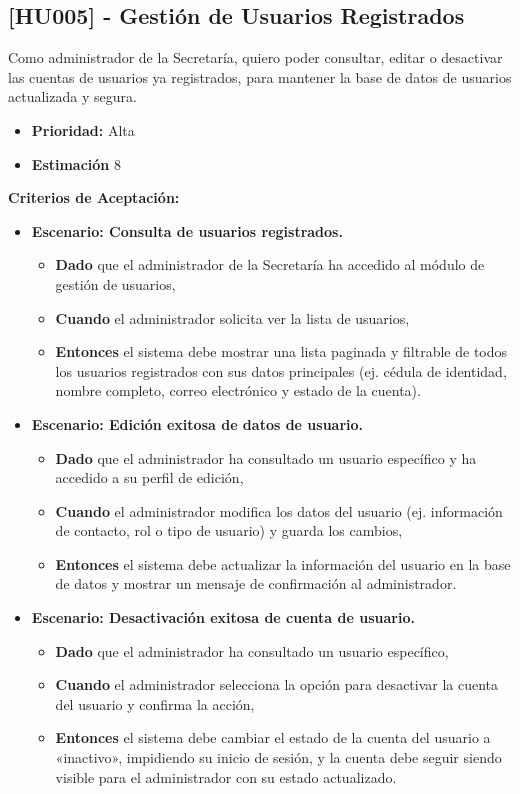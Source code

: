 \documentclass[12pt]{article}
\begin{document}
\pagebreak

\subsection{[HU005] - Gestión de Usuarios Registrados}

Como administrador de la Secretaría, quiero poder consultar, editar o desactivar las cuentas de usuarios ya registrados, para mantener la base de datos de usuarios actualizada y segura.

\begin{itemize}
	\item \textbf{Prioridad:} Alta
	\item \textbf{Estimación} 8
\end{itemize}

\textbf{Criterios de Aceptación:}
\begin{itemize}
	\item \textbf{Escenario: Consulta de usuarios registrados.}
	\begin{itemize}
		\item \textbf{Dado} que el administrador de la Secretaría ha accedido al módulo de gestión de usuarios,
		\item \textbf{Cuando} el administrador solicita ver la lista de usuarios,
		\item \textbf{Entonces} el sistema debe mostrar una lista paginada y filtrable de todos los usuarios registrados con sus datos principales (ej. cédula de identidad, nombre completo, correo electrónico y estado de la cuenta).
	\end{itemize}

	\item \textbf{Escenario: Edición exitosa de datos de usuario.}
	\begin{itemize}
		\item \textbf{Dado} que el administrador ha consultado un usuario específico y ha accedido a su perfil de edición,
		\item \textbf{Cuando} el administrador modifica los datos del usuario (ej. información de contacto, rol o tipo de usuario) y guarda los cambios,
		\item \textbf{Entonces} el sistema debe actualizar la información del usuario en la base de datos y mostrar un mensaje de confirmación al administrador.
	\end{itemize}

	\item \textbf{Escenario: Desactivación exitosa de cuenta de usuario.}
	\begin{itemize}
		\item \textbf{Dado} que el administrador ha consultado un usuario específico,
		\item \textbf{Cuando} el administrador selecciona la opción para desactivar la cuenta del usuario y confirma la acción,
		\item \textbf{Entonces} el sistema debe cambiar el estado de la cuenta del usuario a «inactivo», impidiendo su inicio de sesión, y la cuenta debe seguir siendo visible para el administrador con su estado actualizado.
	\end{itemize}


\end{itemize}
\end{document}
